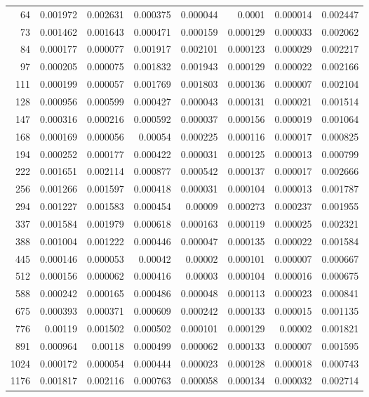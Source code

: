 \begin{tabular}{r r r r r r r r}
64 & 0.001972 & 0.002631 & 0.000375 & 0.000044 & 0.0001 & 0.000014 & 0.002447 \\
73 & 0.001462 & 0.001643 & 0.000471 & 0.000159 & 0.000129 & 0.000033 & 0.002062 \\
84 & 0.000177 & 0.000077 & 0.001917 & 0.002101 & 0.000123 & 0.000029 & 0.002217 \\
97 & 0.000205 & 0.000075 & 0.001832 & 0.001943 & 0.000129 & 0.000022 & 0.002166 \\
111 & 0.000199 & 0.000057 & 0.001769 & 0.001803 & 0.000136 & 0.000007 & 0.002104 \\
128 & 0.000956 & 0.000599 & 0.000427 & 0.000043 & 0.000131 & 0.000021 & 0.001514 \\
147 & 0.000316 & 0.000216 & 0.000592 & 0.000037 & 0.000156 & 0.000019 & 0.001064 \\
168 & 0.000169 & 0.000056 & 0.00054 & 0.000225 & 0.000116 & 0.000017 & 0.000825 \\
194 & 0.000252 & 0.000177 & 0.000422 & 0.000031 & 0.000125 & 0.000013 & 0.000799 \\
222 & 0.001651 & 0.002114 & 0.000877 & 0.000542 & 0.000137 & 0.000017 & 0.002666 \\
256 & 0.001266 & 0.001597 & 0.000418 & 0.000031 & 0.000104 & 0.000013 & 0.001787 \\
294 & 0.001227 & 0.001583 & 0.000454 & 0.00009 & 0.000273 & 0.000237 & 0.001955 \\
337 & 0.001584 & 0.001979 & 0.000618 & 0.000163 & 0.000119 & 0.000025 & 0.002321 \\
388 & 0.001004 & 0.001222 & 0.000446 & 0.000047 & 0.000135 & 0.000022 & 0.001584 \\
445 & 0.000146 & 0.000053 & 0.00042 & 0.00002 & 0.000101 & 0.000007 & 0.000667 \\
512 & 0.000156 & 0.000062 & 0.000416 & 0.00003 & 0.000104 & 0.000016 & 0.000675 \\
588 & 0.000242 & 0.000165 & 0.000486 & 0.000048 & 0.000113 & 0.000023 & 0.000841 \\
675 & 0.000393 & 0.000371 & 0.000609 & 0.000242 & 0.000133 & 0.000015 & 0.001135 \\
776 & 0.00119 & 0.001502 & 0.000502 & 0.000101 & 0.000129 & 0.00002 & 0.001821 \\
891 & 0.000964 & 0.00118 & 0.000499 & 0.000062 & 0.000133 & 0.000007 & 0.001595 \\
1024 & 0.000172 & 0.000054 & 0.000444 & 0.000023 & 0.000128 & 0.000018 & 0.000743 \\
1176 & 0.001817 & 0.002116 & 0.000763 & 0.000058 & 0.000134 & 0.000032 & 0.002714 \\

\end{tabular}
